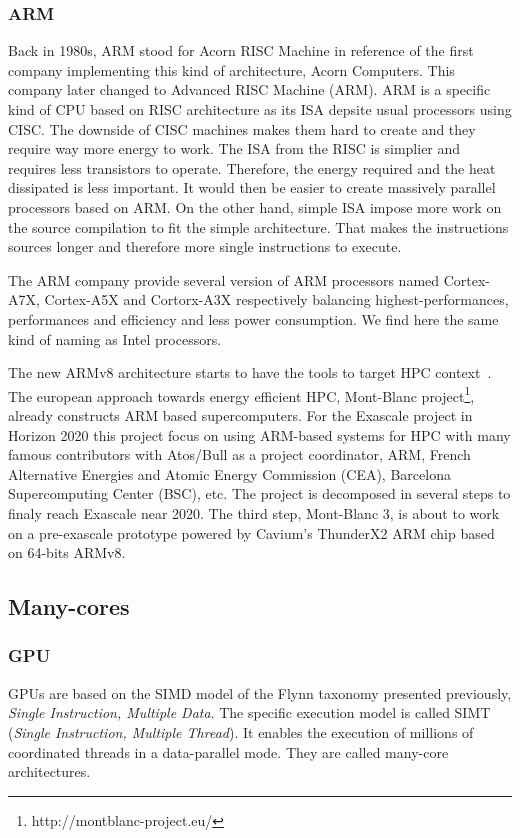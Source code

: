 \subsubsection{ARM}
Back in 1980s, ARM stood for Acorn RISC Machine in reference of the first company implementing this kind of architecture, Acorn Computers. 
This company later changed to Advanced RISC Machine (ARM). 
ARM is a specific kind of CPU based on RISC architecture as its ISA depsite usual processors using CISC.
The downside of CISC machines makes them hard to create and they require way more energy to work. 
The ISA from the RISC is simplier and requires less transistors to operate. 
Therefore, the energy required and the heat dissipated is less important. 
It would then be easier to create massively parallel processors based on ARM. 
On the other hand, simple ISA impose more work on the source compilation to fit the simple architecture. 
That makes the instructions sources longer and therefore more single instructions to execute. 

The ARM company provide several version of ARM processors named Cortex-A7X, Cortex-A5X and Cortorx-A3X respectively balancing highest-performances, performances and efficiency and less power consumption. 
We find here the same kind of naming as Intel processors. 

The new ARMv8 architecture starts to have the tools to target HPC context~\cite{rico2017arm}.
The european approach towards energy efficient HPC, Mont-Blanc project\footnote{http://montblanc-project.eu/}, already constructs ARM based supercomputers. 
For the Exascale project in Horizon 2020 this project focus on using ARM-based systems for HPC with many famous contributors with Atos/Bull as a project coordinator, ARM, French Alternative Energies and Atomic Energy Commission (CEA), Barcelona Supercomputing Center (BSC), etc.
The project is decomposed in several steps to finaly reach Exascale near 2020. 
The third step, Mont-Blanc 3, is about to work on a pre-exascale prototype powered by Cavium’s ThunderX2 ARM chip based on 64-bits ARMv8.

\subsection{Many-cores}

\subsubsection{GPU}

GPUs are based on the SIMD model of the Flynn taxonomy presented previously, \emph{Single Instruction, Multiple Data}.
The specific execution model is called SIMT (\emph{Single Instruction, Multiple Thread}). It enables the execution of millions of coordinated threads in a data-parallel mode. 
They are called many-core architectures.

